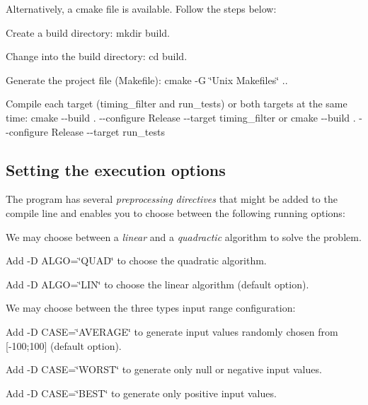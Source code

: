 Alternatively, a cmake file is available. Follow the steps below\+:


\begin{DoxyEnumerate}
\item Create a build directory\+: {\ttfamily mkdir build}.
\item Change into the build directory\+: {\ttfamily cd build}.
\item Generate the project file (Makefile)\+: {\ttfamily cmake -\/G \char`\"{}\+Unix Makefiles\char`\"{} ..}
\item Compile each target ({\ttfamily timing\+\_\+filter} and {\ttfamily run\+\_\+tests}) or both targets at the same time\+: {\ttfamily cmake -\/-\/build . -\/-\/configure Release -\/-\/target timing\+\_\+filter} or {\ttfamily cmake -\/-\/build . -\/-\/configure Release -\/-\/target run\+\_\+tests}
\end{DoxyEnumerate}

\subsection*{Setting the execution options}

The program has several {\itshape preprocessing directives} that might be added to the compile line and enables you to choose between the following running options\+:


\begin{DoxyItemize}
\item We may choose between a {\itshape linear} and a {\itshape quadractic} algorithm to solve the problem.
\begin{DoxyItemize}
\item Add {\ttfamily -\/D A\+L\+GO=\char`\"{}\+Q\+U\+A\+D\char`\"{}} to choose the quadratic algorithm.
\item Add {\ttfamily -\/D A\+L\+GO=\char`\"{}\+L\+I\+N\char`\"{}} to choose the linear algorithm (default option).
\end{DoxyItemize}
\item We may choose between the three types input range configuration\+:
\begin{DoxyItemize}
\item Add {\ttfamily -\/D C\+A\+SE=\char`\"{}\+A\+V\+E\+R\+A\+G\+E\char`\"{}} to generate input values randomly chosen from {\ttfamily \mbox{[}-\/100;100\mbox{]}} (default option).
\item Add {\ttfamily -\/D C\+A\+SE=\char`\"{}\+W\+O\+R\+S\+T\char`\"{}} to generate only null or negative input values.
\item Add {\ttfamily -\/D C\+A\+SE=\char`\"{}\+B\+E\+S\+T\char`\"{}} to generate only positive input values.
\end{DoxyItemize}
\end{DoxyItemize}

